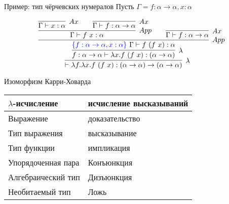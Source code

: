 \documentclass[aspectratio=169]{beamer}
\begin{document}
\begin{frame}{Пример: тип чёрчевских нумералов}
Пусть $\Gamma = f:\alpha\rightarrow\alpha, x: \alpha$

$$\infer[\lambda]{\vdash \lambda f.\lambda x.f\ (f\ x) : (\alpha\rightarrow\alpha)\rightarrow(\alpha\rightarrow\alpha)}{
  \infer[\lambda]{f: \alpha\rightarrow\alpha \vdash \lambda x.f\ (f\ x) : (\alpha\rightarrow\alpha)}{
    \infer[App]{{\color{blue}\{ f:\alpha\rightarrow\alpha, x: \alpha\}\ }\Gamma \vdash f\ (f\ x): \alpha}{
      \infer[App]{\Gamma \vdash f\ x: \alpha}{
        \infer[Ax]{\Gamma \vdash x: \alpha}{}\quad\quad\infer[Ax]{\Gamma \vdash f: \alpha\rightarrow\alpha}{}
      }\quad\quad
      \infer[Ax]{\Gamma \vdash f: \alpha\rightarrow\alpha}{}
    }
  }
}$$
\end{frame}


\begin{frame}{Изоморфизм Карри-Ховарда}

\begin{tabular}{ll}
$\lambda$-исчисление & исчисление высказываний\\\hline
Выражение & доказательство\\
Тип выражения & высказывание\\
Тип функции & импликация\\
Упорядоченная пара & Конъюнкция\\
Алгебраический тип & Дизъюнкция\\
Необитаемый тип & Ложь
\end{tabular}

\end{frame}
\end{document}
